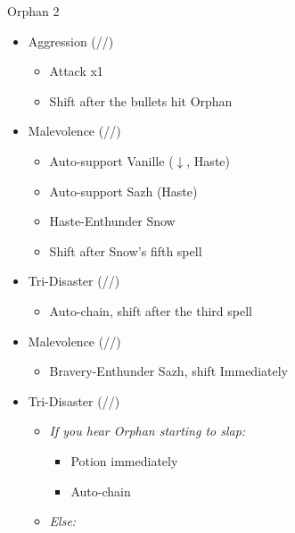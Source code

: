 \renewcommand{\fourth}{[4] Tireless Charge (\com/\com/\med)}
\renewcommand{\second}{[2] Aggression (\com/\com/\rav)}
\renewcommand{\third}{[3] Consolidation (\sen/\sen/\med)}
\renewcommand{\first}{[1] Malevolence (\syn/\rav/\rav)}
\renewcommand{\fifth}{[5] Smart Bomb (\rav/\rav/\sab)}
\renewcommand{\sixth}{[6] Tri-Disaster (\rav/\rav/\rav)}
\begin{battle}[1:05]{Orphan 2}
	\begin{multicols}{2}
		\begin{itemize}
			\item \second
			      \begin{itemize}
				      \item Attack x1
				      \item Shift after the bullets hit Orphan
			      \end{itemize}
			\item \first
			      \begin{itemize}
				      \item Auto-support Vanille ($\downarrow$, Haste)
				      \item Auto-support Sazh (Haste)
				      \item Haste-Enthunder Snow
				      \item Shift after Snow's fifth spell
			      \end{itemize}
			\item \sixth
			      \begin{itemize}
				      \item Auto-chain, shift after the third spell
			      \end{itemize}
			\item \first
			      \begin{itemize}
				      \item Bravery-Enthunder Sazh, shift Immediately
			      \end{itemize}
			      \columnbreak
			\item \sixth
			      \begin{itemize}
				      \item \textit{If you hear Orphan starting to slap:}
				      \begin{itemize}
					\item Potion immediately
				      	\item Auto-chain
				      \end{itemize}
				      \item \textit{Else:}
				      \begin{itemize}

\end{itemize}
\end{itemize}
\end{itemize}
\end{multicols}
\end{battle}
